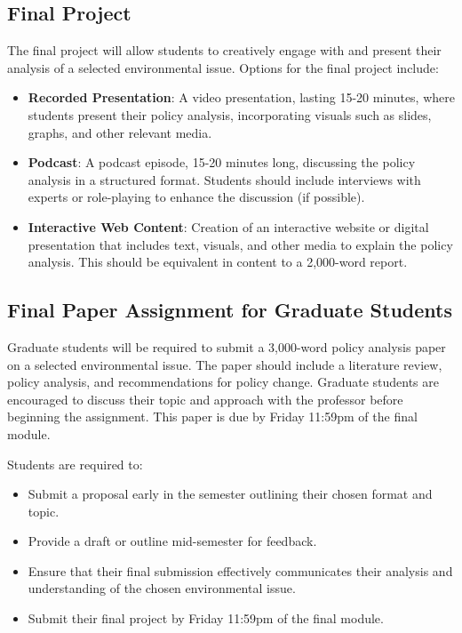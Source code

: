 \documentclass[12pt, letterpaper]{article}
\begin{document}
\subsection*{Final Project}
The final project will allow students to creatively engage with and present their analysis of a selected environmental issue. Options for the final project include:

\begin{itemize}
    \item \textbf{Recorded Presentation}: A video presentation, lasting 15-20 minutes, where students present their policy analysis, incorporating visuals such as slides, graphs, and other relevant media.
    \item \textbf{Podcast}: A podcast episode, 15-20 minutes long, discussing the policy analysis in a structured format. Students should include interviews with experts or role-playing to enhance the discussion (if possible).
    \item \textbf{Interactive Web Content}: Creation of an interactive website or digital presentation that includes text, visuals, and other media to explain the policy analysis. This should be equivalent in content to a 2,000-word report.
\end{itemize}

\subsection*{Final Paper Assignment for Graduate Students}
Graduate students will be required to submit a 3,000-word policy analysis paper on a selected environmental issue. The paper should include a literature review, policy analysis, and recommendations for policy change. Graduate students are encouraged to discuss their topic and approach with the professor before beginning the assignment. This paper is due by Friday 11:59pm of the final module.



Students are required to:
\begin{itemize}
    \item Submit a proposal early in the semester outlining their chosen format and topic.
    \item Provide a draft or outline mid-semester for feedback.
    \item Ensure that their final submission effectively communicates their analysis and understanding of the chosen environmental issue.
    \item Submit their final project by Friday 11:59pm of the final module.
\end{itemize}
\end{document}
